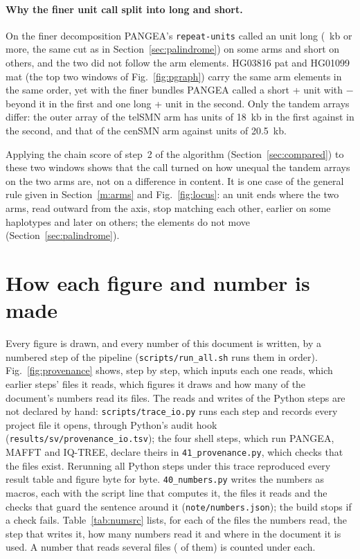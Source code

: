 \paragraph{Why the finer unit call split  into long and short.} On the finer decomposition PANGEA's \texttt{repeat-units} called an  unit long (\elUnitLong~kb or more, the same cut as in Section~\ref{sec:palindrome}) on some arms and short on others, and the two did not follow the arm elements. HG03816 pat and HG01099 mat (the top two windows of Fig.~\ref{fig:pgraph}) carry the same arm elements in the same order, yet with the finer bundles PANGEA called a short + unit with $-$
beyond it in the first and one long + unit in the second. Only the tandem arrays differ: the outer array of the telSMN arm
has \grPatTel{} units of 18~kb in the first against \grMatTel{} in the second, and that of the cenSMN arm \grPatCen{}
against \grMatCen{} units of 20.5~kb.

Applying the chain score of step~2 of the algorithm (Section~\ref{sec:compared}) to these two windows shows that the call turned on how unequal the tandem arrays on the two arms are,
not on a difference in content. It is one case of the general rule given in Section~\ref{m:arms} and Fig.~\ref{fig:locus}:
an  unit ends where the two arms, read outward from the axis, stop matching each other, earlier on some
haplotypes and later on others; the elements do not move
(Section~\ref{sec:palindrome}).


\section{How each figure and number is made}\label{sec:provenance}
Every figure is drawn, and every number of this document is written, by a numbered step of the pipeline
(\texttt{scripts/run\_all.sh} runs them in order). Fig.~\ref{fig:provenance} shows, step by step, which inputs each one
reads, which earlier steps' files it reads, which figures it draws and how many of the document's numbers read its
files. The reads and writes of the Python steps are not declared by hand: \texttt{scripts/trace\_io.py} runs each step
and records every project file it opens, through Python's audit hook (\texttt{results/sv/provenance\_io.tsv}); the four
shell steps, which run PANGEA, MAFFT and IQ-TREE, declare theirs in \texttt{41\_provenance.py}, which checks that the
files exist. Rerunning all Python steps under this trace reproduced every result table and figure byte for byte.
\texttt{40\_numbers.py} writes the \pvNumbers{} numbers as macros, each with the script line that computes it, the
files it reads and the checks that guard the sentence around it (\texttt{note/numbers.json}); the build stops if a
check fails. Table~\ref{tab:numsrc} lists, for each of the \pvFiles{} files the numbers read, the step that writes it,
how many numbers read it and where in the document it is used. A number that reads several files (\pvMulti{} of
them) is counted under each.

